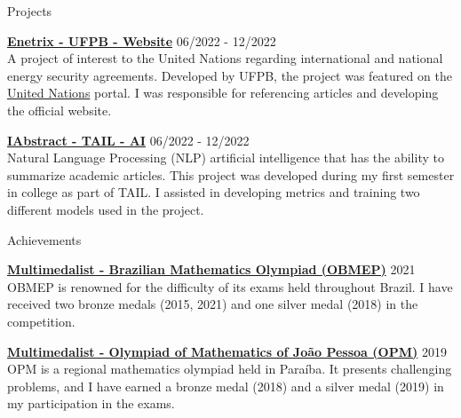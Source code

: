 \documentclass{resume}
\begin{document}

\begin{rSection}{Projects}

\item \textbf{\href{https://enetrix.ufpb.br/}{Enetrix - UFPB - Website}} \hfill 06/2022 - 12/2022 \\
A project of interest to the United Nations regarding international and national energy security agreements. Developed by UFPB, the project was featured on the \href{https://www.un.org/en/academic-impact/insights-energy-diplomacy-and-un-data-intensive-research-brazilian-universities}{United Nations} portal. I was responsible for referencing articles and developing the official website.

\item \textbf{\href{https://github.com/ralfferreira/generate-abstract}{IAbstract - TAIL - AI}} \hfill 06/2022 - 12/2022 \\
Natural Language Processing (NLP) artificial intelligence that has the ability to summarize academic articles. This project was developed during my first semester in college as part of TAIL. I assisted in developing metrics and training two different models used in the project.


\end{rSection}


\begin{rSection}{Achievements}

\item \textbf{\href{http://www.obmep.org.br/}{Multimedalist - Brazilian Mathematics Olympiad (OBMEP)}} \hfill 2021 \\
OBMEP is renowned for the difficulty of its exams held throughout Brazil. I have received two bronze medals (2015, 2021) and one silver medal (2018) in the competition.

\item \textbf{\href{http://www.mat.ufpb.br/opm/}{Multimedalist - Olympiad of Mathematics of João Pessoa (OPM)}} \hfill 2019 \\
OPM is a regional mathematics olympiad held in Paraíba. It presents challenging problems, and I have earned a bronze medal (2018) and a silver medal (2019) in my participation in the exams.

\end{rSection}
\end{document}
